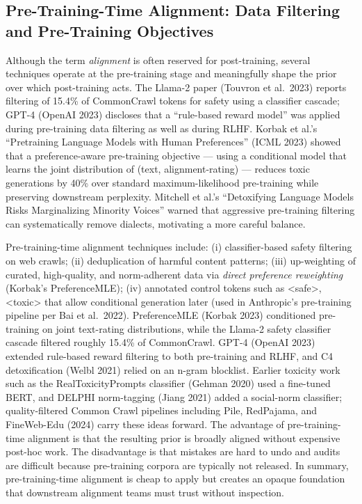 \documentclass{article}
\begin{document}
\subsection{Pre-Training-Time Alignment: Data Filtering and Pre-Training Objectives}\label{pre-training-time-alignment-data-filtering-and-pre-training-objectives}

Although the term \emph{alignment} is often reserved for post-training, several techniques operate at the pre-training stage and meaningfully shape the prior over which post-training acts. The Llama-2 paper (Touvron et al.~2023) reports filtering of 15.4\% of CommonCrawl tokens for safety using a classifier cascade; GPT-4 (OpenAI 2023) discloses that a ``rule-based reward model'' was applied during pre-training data filtering as well as during RLHF. Korbak et al.'s ``Pretraining Language Models with Human Preferences'' (ICML 2023) showed that a preference-aware pre-training objective --- using a conditional model that learns the joint distribution of (text, alignment-rating) --- reduces toxic generations by 40\% over standard maximum-likelihood pre-training while preserving downstream perplexity. Mitchell et al.'s ``Detoxifying Language Models Risks Marginalizing Minority Voices'' warned that aggressive pre-training filtering can systematically remove dialects, motivating a more careful balance.

Pre-training-time alignment techniques include: (i) classifier-based safety filtering on web crawls; (ii) deduplication of harmful content patterns; (iii) up-weighting of curated, high-quality, and norm-adherent data via \emph{direct preference reweighting} (Korbak's PreferenceMLE); (iv) annotated control tokens such as \textless\textbar safe\textbar\textgreater, \textless\textbar toxic\textbar\textgreater{} that allow conditional generation later (used in Anthropic's pre-training pipeline per Bai et al.~2022). PreferenceMLE (Korbak 2023) conditioned pre-training on joint text-rating distributions, while the Llama-2 safety classifier cascade \citep{touvron20232023} filtered roughly 15.4\% of CommonCrawl. GPT-4 (OpenAI 2023) extended rule-based reward filtering to both pre-training and RLHF, and C4 detoxification (Welbl 2021) relied on an n-gram blocklist. Earlier toxicity work such as the RealToxicityPrompts classifier (Gehman 2020) used a fine-tuned BERT, and DELPHI norm-tagging (Jiang 2021) added a social-norm classifier; quality-filtered Common Crawl pipelines including Pile, RedPajama, and FineWeb-Edu (2024) carry these ideas forward. The advantage of pre-training-time alignment is that the resulting prior is broadly aligned without expensive post-hoc work. The disadvantage is that mistakes are hard to undo and audits are difficult because pre-training corpora are typically not released. In summary, pre-training-time alignment is cheap to apply but creates an opaque foundation that downstream alignment teams must trust without inspection.
\end{document}
